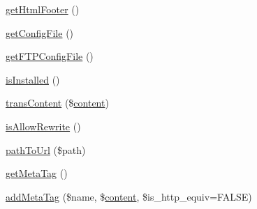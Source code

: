 \begin{DoxyCompactItemize}
\item 
\hyperlink{classContext_ae7bb6879f84366eea76da3a7bf6a40bd}{get\+Html\+Footer} ()
\item 
\hyperlink{classContext_a7ac0928e07cfc7f19f9a7341c50b4811}{get\+Config\+File} ()
\item 
\hyperlink{classContext_ab7bb799f55be29174c8a15659dab823a}{get\+F\+T\+P\+Config\+File} ()
\item 
\hyperlink{classContext_a5a8714e3a0f9d4722a31ce73017c6613}{is\+Installed} ()
\item 
\hyperlink{classContext_a4767b003bd726a994b1bf6bf68a3bb7e}{trans\+Content} (\$\hyperlink{classcontent}{content})
\item 
\hyperlink{classContext_aa11482b69f0892e9e8013e08c9914ff4}{is\+Allow\+Rewrite} ()
\item 
\hyperlink{classContext_a6012ceb6e62fc99b0e2b24e475ba4da7}{path\+To\+Url} (\$path)
\item 
\hyperlink{classContext_a8ee4ad4396e92a54d2aa7d079771619f}{get\+Meta\+Tag} ()
\item 
\hyperlink{classContext_aeae29df3bedc1f90a497d34543a08f7f}{add\+Meta\+Tag} (\$name, \$\hyperlink{classcontent}{content}, \$is\+\_\+http\+\_\+equiv=F\+A\+L\+S\+E)
\end{DoxyCompactItemize}
